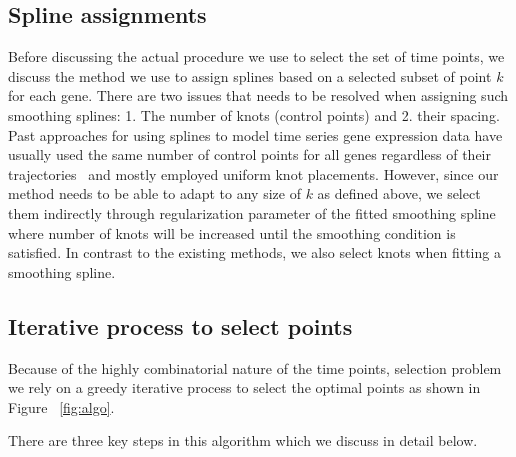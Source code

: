 \documentclass[10pt]{article}
\begin{document}
\subsection{Spline assignments}

Before discussing the actual procedure we use to select the set of
time points, we discuss the method we use to assign splines based on
a selected subset of point $k$ for each gene. There are two issues
that needs to be resolved when assigning such smoothing splines: 1.
The number of knots (control points) and 2. their spacing. Past
approaches for using splines to model time series gene expression
data have usually used the same number of control points for all
genes regardless of their trajectories~\cite{bar2012, singh2005} and mostly employed uniform
knot placements. However, since our method needs to be able to adapt
to any size of $k$ as defined above, we select them indirectly through
regularization parameter of the fitted smoothing spline where number
of knots will be increased until the smoothing condition is
satisfied. In contrast to the existing methods, we also select knots when fitting a smoothing spline.

\subsection{Iterative process to select points}\label{sec:mainalgo}

Because of the highly combinatorial nature of the time points, selection problem we rely on a greedy iterative process to select
the optimal points as shown in Figure ~\ref{fig:algo}.

There are three key steps in this algorithm which we discuss in
detail below.
\end{document}
